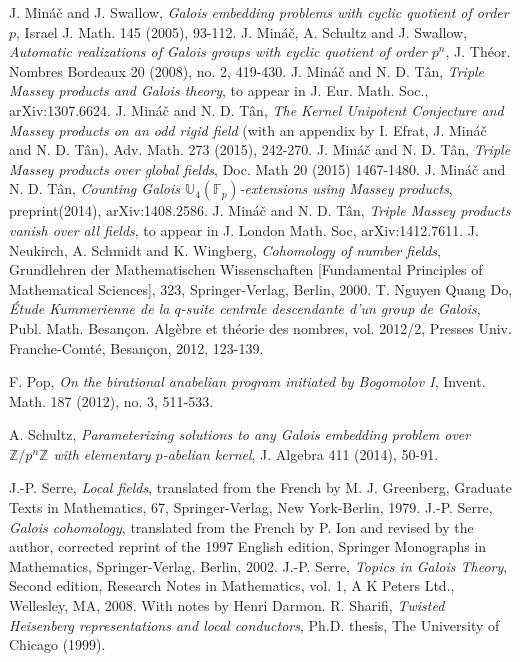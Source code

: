 \documentclass[12pt,leqno]{amsart}
\theoremstyle{plain}
\theoremstyle{definition}
\newcommand{\F}{{\mathbb F}}
\newcommand{\U}{{\mathbb U}}
\newcommand{\Z}{{\mathbb Z}}
\begin{document}
\begin{thebibliography}{999999999}
 J. Min\'a\v{c} and J. Swallow, {\it Galois embedding problems with cyclic quotient of order $p$}, Israel J. Math. 145 (2005), 93-112. 
 J. Min\'a\v{c}, A. Schultz and J. Swallow,  {\it Automatic realizations of Galois groups with cyclic quotient of order $p^n$}, J. Th\'eor. Nombres Bordeaux 20 (2008), no. 2, 419-430. 
 J. Min\'a\v{c} and N. D. T{\^a}n, {\it Triple Massey products and Galois theory}, to appear in J. Eur. Math. Soc., arXiv:1307.6624.
 J. Min\'a\v{c} and N. D. T{\^a}n, {\it The Kernel Unipotent Conjecture and Massey products on an odd rigid field} (with an appendix by I. Efrat, J. Min\'a\v{c} and N. D. T{\^a}n), Adv. Math.  273 (2015), 242-270.
 J. Min\'a\v{c} and N. D. T{\^a}n, {\it Triple Massey products over global fields}, Doc. Math 20 (2015) 1467-1480.
 J. Min\'a\v{c} and N. D. T{\^a}n, {\it Counting Galois $\U_4(\F_p)$-extensions using Massey products}, preprint(2014), arXiv:1408.2586.
 J. Min\'a\v{c} and N. D. T{\^a}n, {\it Triple Massey products vanish over all fields}, to appear in J. London Math. Soc,  	arXiv:1412.7611.
 J. Neukirch, A. Schmidt and K. Wingberg, {\it Cohomology of number fields}, Grundlehren der Mathematischen Wissenschaften [Fundamental Principles of Mathematical Sciences], 323, Springer-Verlag, Berlin, 2000. 
 T. Nguyen Quang Do, {\it {\'E}tude Kummerienne de la $q$-suite centrale descendante d'un group de Galois}, Publ. Math. Besan\c{c}on. Alg\`ebre et th\'eorie des nombres, vol. 2012/2, Presses Univ. Franche-Comt\'e, Besan\c{c}on, 2012, 123-139.

 F. Pop, {\it On the birational anabelian program initiated by Bogomolov I}, Invent. Math. 187 (2012), no. 3, 511-533.

 A. Schultz, {\it Parameterizing solutions to any Galois embedding problem over $\Z/p^n\Z$ with elementary $p$-abelian kernel}, J. Algebra 411 (2014), 50-91. 

 J.-P. Serre, {\it Local fields},  translated from the French by M. J. Greenberg, Graduate Texts in Mathematics, 67, Springer-Verlag, New York-Berlin, 1979.
 J.-P. Serre, {\it Galois cohomology}, translated from the French by P. Ion and revised by the author, corrected reprint of the 1997 English edition, Springer Monographs in Mathematics, Springer-Verlag, Berlin, 2002. 
 J.-P. Serre, {\it Topics in Galois Theory},  Second edition, Research Notes in Mathematics, vol. 1, A K Peters Ltd., Wellesley, MA, 2008. With notes by Henri Darmon. 
 R. Sharifi, {\it Twisted Heisenberg representations and local conductors}, Ph.D. thesis, The University of Chicago (1999). 



\end{thebibliography}
\end{document}
